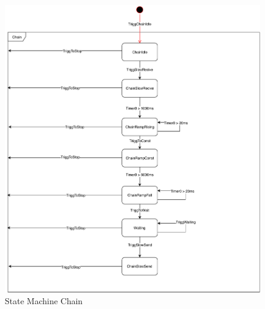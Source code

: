\documentclass[a4paper,12pt,twoside]{scrreprt}
\begin{document}
\begin{figure}[H]
	\centering
	\includegraphics[width=\textwidth,height=\textheight,keepaspectratio]{stateDiagram/StateMachineChain.pdf}
	\caption[State Machine Chain]{State Machine Chain}
	\label{fig:StateMachineChain}
\end{figure}
\end{document}
